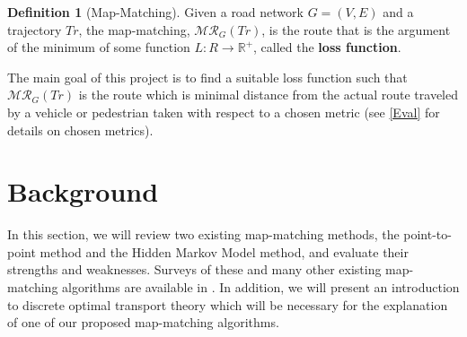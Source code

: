 \documentclass{article}
\numberwithin{equation}{section}
\theoremstyle{definition}
\newtheorem{definition}{Definition}[section]
\begin{document}

\begin{definition}[Map-Matching]
Given a road network $G=(V, E)$ and a trajectory
$Tr$, the map-matching, $\mathcal{MR}_G(Tr)$, is the route that is the argument of the minimum of some function $L:R\rightarrow \mathbb{R}^+$, called the \textbf{loss function}. 
\end{definition}


The main goal of this project is to find a suitable loss function such that  $\mathcal{MR}_G(Tr)$ is the route which is minimal distance from the actual route traveled by a vehicle or pedestrian taken with respect to a chosen metric (see \autoref{Eval} for details on chosen metrics).







    



\section{Background}

In this section, we will review two existing map-matching methods, the point-to-point method and the Hidden Markov Model method, and evaluate their strengths and weaknesses. Surveys of these and many other existing map-matching algorithms are available in \cite{CXHZ,QON}.
In addition, we will present an introduction to discrete optimal transport theory which will be necessary for the explanation of one of our proposed map-matching algorithms.
\end{document}

